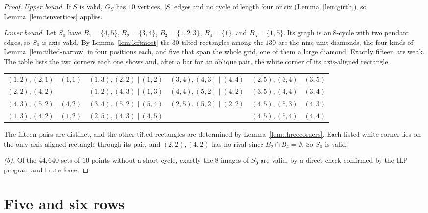 \begin{proof}
\emph{Upper bound.} If $S$ is valid, $G_S$ has $10$ vertices, $|S|$ edges and no cycle of
length four or six (Lemma~\ref{lem:girth}), so Lemma~\ref{lem:tenvertices} applies.

\emph{Lower bound.} Let $S_0$ have $B_1=\{4,5\}$, $B_2=\{3,4\}$, $B_3=\{1,2,3\}$, $B_4=\{1\}$, and $B_5=\{1,5\}$. Its graph is an $8$-cycle with two pendant
edges, so $S_0$ is axis-valid. By Lemma~\ref{lem:leftmost} the $30$ tilted rectangles among
the $130$ are the nine unit diamonds, the four kinds of Lemma~\ref{lem:tilted-narrow} in four
positions each, and five that span the whole grid, one of them a large diamond. Exactly fifteen are weak. The
table lists the two corners each one shows and, after a bar for an oblique pair, the white
corner of its axis-aligned rectangle.
\begin{center}\footnotesize
\begin{tabular}{@{}llll@{}}
$(1,2),(2,1)\mid(1,1)$ & $(1,3),(2,2)\mid(1,2)$ & $(3,4),(4,3)\mid(4,4)$ & $(2,5),(3,4)\mid(3,5)$ \\
$(2,2),(4,2)$ & $(1,2),(4,3)\mid(1,3)$ & $(4,4),(5,2)\mid(4,2)$ & $(3,5),(4,4)\mid(3,4)$ \\
$(4,3),(5,2)\mid(4,2)$ & $(3,4),(5,2)\mid(5,4)$ & $(2,5),(5,2)\mid(2,2)$ & $(4,5),(5,3)\mid(4,3)$ \\
$(1,3),(4,2)\mid(1,2)$ & $(2,5),(4,3)\mid(4,5)$ & & $(4,5),(5,4)\mid(4,4)$ \\
\end{tabular}
\end{center}
The fifteen pairs are distinct, and the other tilted rectangles are determined by
Lemma~\ref{lem:threecorners}. Each listed white corner lies on the only axis-aligned rectangle
through its pair, and $(2,2),(4,2)$ has no rival since $B_2\cap B_4=\emptyset$. So $S_0$ is valid.

\emph{(b).} Of the $44{,}640$ sets of $10$ points without a short cycle, exactly the $8$
images of $S_0$ are valid, by a direct check confirmed by the ILP program and brute force.
\end{proof}

\section{Five and six rows}\label{sec:five}

